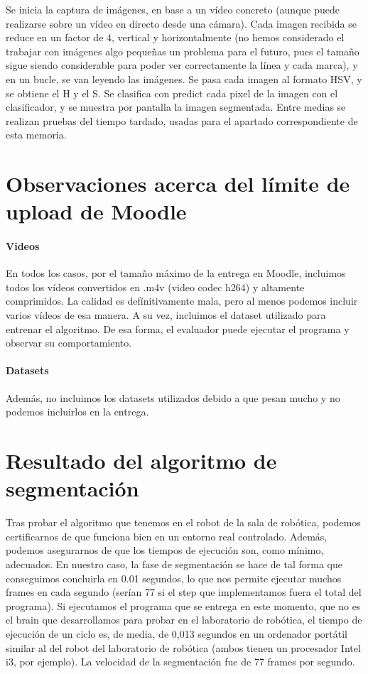 \documentclass{article}
\begin{document}
	Se inicia la captura de imágenes, en base a un vídeo concreto (aunque puede realizarse sobre un vídeo en directo desde una cámara). Cada imagen recibida se reduce en un factor de 4, vertical y horizontalmente (no hemos considerado el trabajar con imágenes algo pequeñas un problema para el futuro, pues el tamaño sigue siendo considerable para poder ver correctamente la línea y cada marca), y en un bucle, se van leyendo las imágenes. Se pasa cada imagen al formato HSV, y se obtiene el H y el S. Se clasifica con predict cada pixel de la imagen con el clasificador, y se muestra por pantalla la imagen segmentada. Entre medias se realizan pruebas del tiempo tardado, usadas para el apartado correspondiente de esta memoria.

\section{Observaciones acerca del límite de upload de Moodle}
    \paragraph{Videos}
    En todos los casos, por el tamaño máximo de la entrega en Moodle, incluimos todos los vídeos convertidos en .m4v (video codec h264) y altamente comprimidos. La calidad es defínitivamente mala, pero al menos podemos incluir varios vídeos de esa manera. A su vez, incluimos el dataset utilizado para entrenar el algoritmo. De esa forma, el evaluador puede ejecutar el programa y observar su comportamiento.
    
    \paragraph{Datasets}
    Además, no incluimos los datasets utilizados debido a que pesan mucho y no podemos incluirlos en la entrega.

\section{Resultado del algoritmo de segmentación}
	Tras probar el algoritmo que tenemos en el robot de la sala de robótica, podemos certificarnos de que funciona bien en un entorno real controlado. Además, podemos asegurarnos de que los tiempos de ejecución son, como mínimo, adecuados. En nuestro caso, la fase de segmentación se hace de tal forma que conseguimos concluirla en 0.01 segundos, lo que nos permite ejecutar muchos frames en cada segundo (serían 77 si el step que implementamos fuera el total del programa). Si ejecutamos el programa que se entrega en este momento, que no es el brain que desarrollamos para probar en el laboratorio de robótica, el tiempo de ejecución de un ciclo es, de media, de 0,013 segundos en un ordenador portátil similar al del robot del laboratorio de robótica (ambos tienen un procesador Intel i3, por ejemplo). La velocidad de la segmentación fue de 77 frames por segundo.
\end{document}
